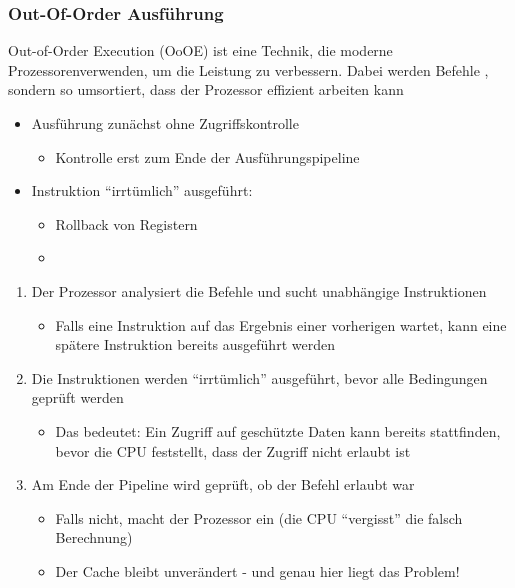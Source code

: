 \subsubsection*{Out-Of-Order Ausführung}
\begin{infoBox}
    Out-of-Order Execution (OoOE) ist eine Technik, die moderne Prozessorenverwenden, um die Leistung zu verbessern. Dabei werden Befehle , sondern so umsortiert, dass der Prozessor effizient arbeiten kann
\end{infoBox}
\begin{itemize}
    \item Ausführung zunächst ohne Zugriffskontrolle
    \begin{itemize}
        \item Kontrolle erst zum Ende der Ausführungspipeline
    \end{itemize}
    \item Instruktion \enquote{irrtümlich} ausgeführt:
    \begin{itemize}
        \item Rollback von Registern
        \item {}
    \end{itemize}
\end{itemize}
\begin{infoBox}[title=Wie funktioniert Out-of-Order Execution?]
    \begin{enumerate}
        \item Der Prozessor analysiert die Befehle und sucht unabhängige Instruktionen
        \begin{itemize}
            \item Falls eine Instruktion auf das Ergebnis einer vorherigen wartet, kann eine spätere Instruktion bereits ausgeführt werden
        \end{itemize}
        \item Die Instruktionen werden \enquote{irrtümlich} ausgeführt, bevor alle Bedingungen geprüft werden
        \begin{itemize}
            \item Das bedeutet: Ein Zugriff auf geschützte Daten kann bereits stattfinden, bevor die CPU feststellt, dass der Zugriff nicht erlaubt ist
        \end{itemize}
        \item Am Ende der Pipeline wird geprüft, ob der Befehl erlaubt war
        \begin{itemize}
            \item Falls nicht, macht der Prozessor ein  (die CPU \enquote{vergisst} die falsch Berechnung)
            \item {} Der Cache bleibt unverändert - und genau hier liegt das Problem!
        \end{itemize}
    \end{enumerate}
\end{infoBox}
